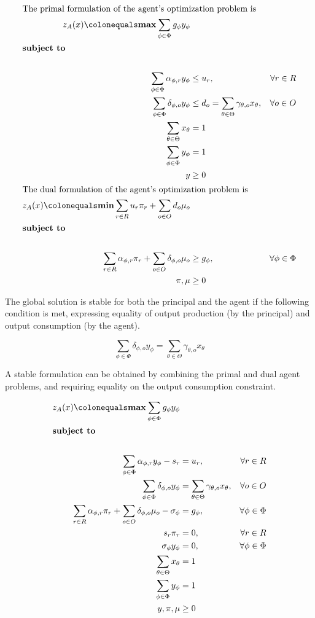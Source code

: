 \begin{align} 
  \intertext{The primal formulation of the agent's optimization problem is}
    z_A(x) \colonequals \boldsymbol{\max} \sum_{\phi \in \Phi} g_{\phi} y_{\phi} \\
    \shortintertext{\textbf{subject to} \nonumber} \\
     \sum_{\phi \in \Phi} \alpha_{\phi,r} y_{\phi} & \leq u_r , & \forall r \in R \\
     \sum_{\phi \in \Phi} \delta_{\phi,o} y_{\phi} & \leq d_o = \sum_{\theta \in \Theta} \gamma_{\theta,o} x_{\theta} , & \forall o \in O \\
     \sum_{\theta \in \Theta} x_\theta & = 1 \\
     \sum_{\phi \in \Phi} y_\phi & = 1 \\
     y & \geq 0 \\
    \intertext{The dual formulation of the agent's optimization problem is}
   z_A(x) \colonequals \boldsymbol{\min} \sum_{r \in R} u_r \pi_r + \sum_{o \in O} d_o \mu_o \\
    \shortintertext{\textbf{subject to} \nonumber} \\
     \sum_{r \in R} \alpha_{\phi,r} \pi_r + \sum_{o \in O} \delta_{\phi,o} \mu_o & \geq  g_{\phi} , & \forall \phi \in \Phi \\
    \pi, \mu & \geq 0 
\end{align}

The global solution is stable for both the principal and the agent if the following condition is met, expressing equality of output production (by the principal) and output consumption (by the agent).

\begin{equation}
\sum_{\phi \in \Phi} \delta_{\phi,o} y_{\phi}  = \sum_{\theta \in \Theta} \gamma_{\theta,o} x_{\theta}
\end{equation}

A stable formulation can be obtained by combining the primal and dual agent problems, and requiring equality on the output consumption constraint.

\begin{align} 
    z_A(x) \colonequals \boldsymbol{\max}  \sum_{\phi \in \Phi} g_{\phi} y_{\phi} \\
    \shortintertext{\textbf{subject to} \nonumber} \\
    \sum_{\phi \in \Phi} \alpha_{\phi,r} y_{\phi}  - s_r  & = u_r, & \forall r \in R \\
    \sum_{\phi \in \Phi} \delta_{\phi,o} y_{\phi} & = \sum_{\theta \in \Theta} \gamma_{\theta,o} x_{\theta} , & \forall o \in O \\
    \sum_{r \in R} \alpha_{\phi,r} \pi_r + \sum_{o \in O} \delta_{\phi,o} \mu_o - \sigma_\phi  & = g_{\phi} , & \forall \phi \in \Phi \\
     s_r \pi_r & = 0 , & \forall r \in R \\
    \sigma_{\phi} y_{\phi} & = 0 , & \forall \phi \in \Phi \\
    \sum_{\theta \in \Theta} x_\theta & = 1 \\
    \sum_{\phi \in \Phi} y_\phi & = 1 \\
    y, \pi, \mu & \geq 0 
\end{align}

